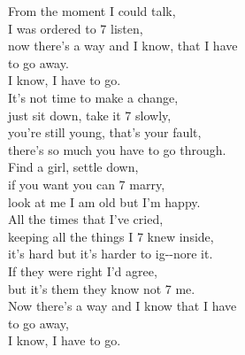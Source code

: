 From the  moment I could  talk, \\ 
I was  ordered to 7 listen, \\ 
now there’s a  way and I  know, that I  have \\ 
to  go away. \\ 
I  know, I  have to  go. \\ 
It’s not  time to make a  change, \\ 
just sit  down, take it 7 slowly, \\ 
you’re still  young, that’s your  fault, \\ 
there’s so  much you have to go  through. \\ 
Find a  girl, settle  down, \\ 
if you  want you can 7 marry, \\ 
look at  me I am  old but I’m  happy.  \\ 
All the  times that I’ve  cried, \\ 
keeping  all the things I 7 knew inside, \\ 
it’s  hard but it’s  harder to ig--nore it.  \\ 
If they were  right I’d  agree, \\ 
but it’s  them they know not 7 me. \\ 
Now there’s a  way and I  know that I  have \\ 
to  go away, \\ 
I  know, I  have to  go.

